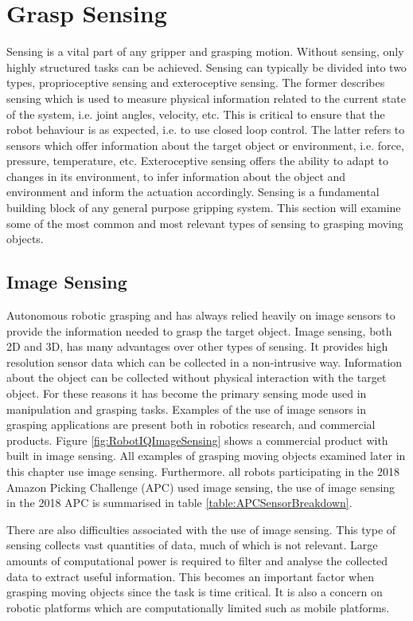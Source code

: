 \section{Grasp Sensing}
Sensing is a vital part of any gripper and grasping motion. Without sensing, only highly structured tasks can be achieved. Sensing can typically be divided into two types, proprioceptive sensing and exteroceptive sensing. The former describes sensing which is used to measure physical information related to the current state of the system, i.e. joint angles, velocity, etc. This is critical to ensure that the robot behaviour is as expected, i.e. to use closed loop control. The latter refers to sensors which offer information about the target object or environment, i.e. force, pressure, temperature, etc. Exteroceptive sensing offers the ability to adapt to changes in its environment, to infer information about the object and environment and inform the actuation accordingly. Sensing is a fundamental building block of any general purpose gripping system. This section will examine some of the most common and most relevant types of sensing to grasping moving objects. 

\subsection{Image Sensing}

Autonomous robotic grasping and has always relied heavily on image sensors to provide the information needed to grasp the target object. Image sensing, both 2D and 3D, has many advantages over other types of sensing. It provides high resolution sensor data which can be collected in a non-intrusive way. Information about the object can be collected without physical interaction with the target object. For these reasons it has become the primary sensing mode used in manipulation and grasping tasks. Examples of the use of image sensors in grasping applications are present both in robotics research, and commercial products. Figure \ref{fig:RobotIQImageSensing} shows a commercial product with built in image sensing. All examples of grasping moving objects examined later in this chapter use image sensing. Furthermore. all robots participating in the 2018 Amazon Picking Challenge (APC)\cite{APCObservations} used image sensing, the use of image sensing in the 2018 APC is summarised in table \ref{table:APCSensorBreakdown}.

There are also difficulties associated with the use of image sensing. This type of sensing collects vast quantities of data, much of which is not relevant. Large amounts of computational power is required to filter and analyse the collected data to extract useful information. This becomes an important factor when grasping moving objects since the task is time critical. It is also a concern on robotic platforms which are computationally limited such as mobile platforms.

